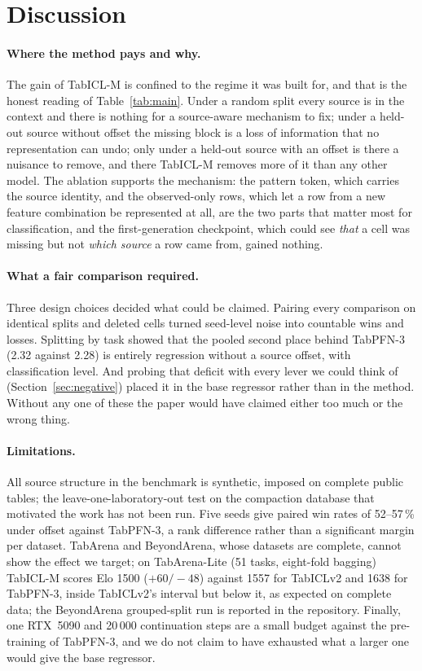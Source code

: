 \documentclass[11pt]{article}
\begin{document}
\section{Discussion}
\label{sec:discussion}

\paragraph{Where the method pays and why.} The gain of TabICL-M is confined to the
regime it was built for, and that is the honest reading of Table~\ref{tab:main}. Under a
random split every source is in the context and there is nothing for a source-aware
mechanism to fix; under a held-out source without offset the missing block is a loss of
information that no representation can undo; only under a held-out source with an
offset is there a nuisance to remove, and there TabICL-M removes more of it than any
other model. The ablation supports the mechanism: the pattern token, which carries the
source identity, and the observed-only rows, which let a row from a new feature
combination be represented at all, are the two parts that matter most for
classification, and the first-generation checkpoint, which could see \emph{that} a cell
was missing but not \emph{which source} a row came from, gained nothing.

\paragraph{What a fair comparison required.} Three design choices decided what could
be claimed. Pairing every comparison on identical splits and deleted cells turned
seed-level noise into countable wins and losses. Splitting by task showed that the
pooled second place behind TabPFN-3 (2.32 against 2.28) is entirely regression without a
source offset, with classification level. And probing that deficit with every lever we
could think of (Section~\ref{sec:negative}) placed it in the base regressor rather than in
the method. Without any one of these the paper would have claimed either too much or the
wrong thing.

\paragraph{Limitations.} All source structure in the benchmark is synthetic, imposed on
complete public tables; the leave-one-laboratory-out test on the compaction database
that motivated the work has not been run. Five seeds give paired win rates of 52--57\,\%
under offset against TabPFN-3, a rank difference rather than a significant margin per
dataset. TabArena and BeyondArena, whose datasets are complete, cannot show the effect
we target; on TabArena-Lite (51 tasks, eight-fold bagging) TabICL-M scores Elo 1500
($+60/-48$) against 1557 for TabICLv2 and 1638 for TabPFN-3, inside TabICLv2's interval
but below it, as expected on complete data; the BeyondArena grouped-split run is
reported in the repository. Finally, one RTX~5090 and 20\,000 continuation steps are a small budget
against the pre-training of TabPFN-3, and we do not claim to have exhausted what a
larger one would give the base regressor.
\end{document}
